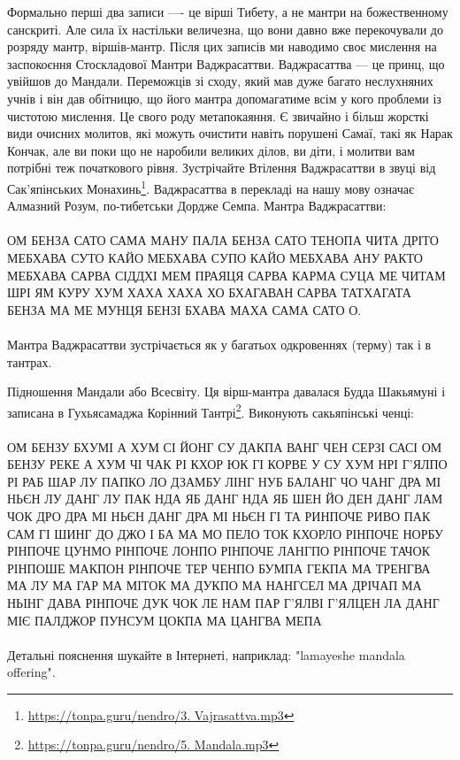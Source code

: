 Формально перші два записи ---- це вірші Тибету, а не мантри
на божественному санскриті. Але сила їх настільки величезна, що
вони давно вже перекочували до розряду мантр, віршів-мантр. Після
цих записів ми наводимо своє мислення на заспокоєння Стоскладової
Мантри Ваджрасаттви. Ваджрасаттва --- це принц, що увійшов до Мандали.
Переможців зі сходу, який мав дуже багато неслухняних
учнів і він дав обітницю, що його мантра допомагатиме всім у кого
проблеми із чистотою мислення. Це свого роду метапокаяння.
Є звичайно і більш жорсткі види очисних молитов, які можуть
очистити навіть порушені Самаї, такі як Нарак Кончак, але ви поки що
не наробили великих ділов, ви діти, і молитви вам потрібні теж початкового
рівня. Зустрічайте Втілення Ваджрасаттви в звуці від
Сак'япінських Монахинь\footnote{\url{https://tonpa.guru/nendro/3. Vajrasattva.mp3}}.
Ваджрасаттва в перекладі на нашу мову означає Алмазний Розум, по-тибетськи
Дордже Семпа. Мантра Ваджрасаттви:
\\
\\
ОМ БЕНЗА САТО САМА МАНУ ПАЛА БЕНЗА САТО ТЕНОПА ЧИТА ДРІТО
МЕБХАВА СУТО КАЙО МЕБХАВА СУПО КАЙО МЕБХАВА АНУ РАКТО МЕБХАВА
САРВА СІДДХІ МЕМ ПРАЯЦЯ САРВА КАРМА СУЦА МЕ ЧИТАМ ШРІ ЯМ КУРУ
ХУМ ХАХА ХАХА ХО БХАГАВАН САРВА ТАТХАГАТА БЕНЗА МА МЕ МУНЦЯ
БЕНЗІ БХАВА МАХА САМА САТО О.
\\
\\
Мантра Ваджрасаттви зустрічається як у багатьох одкровеннях (терму) так і в тантрах.

Підношення Мандали або Всесвіту. Ця вірш-мантра давалася
Будда Шакьямуні і записана в Гухьясамаджа Корінний
Тантрі\footnote{\url{https://tonpa.guru/nendro/5. Mandala.mp3}}.
Виконують сакьяпінські ченці:
\\
\\
ОМ БЕНЗУ БХУМІ А ХУМ СІ ЙОНГ СУ ДАКПА ВАНГ ЧЕН СЕРЗІ
САСІ ОМ БЕНЗУ РЕКЕ А ХУМ ЧІ ЧАК РІ КХОР ЮК ГІ КОРВЕ
У СУ ХУМ НРІ Г'ЯЛПО РІ РАБ ШАР ЛУ ПАПКО ЛО ДЗАМБУ
ЛІНГ НУБ БАЛАНГ ЧО ЧАНГ ДРА МІ НЬЄН ЛУ ДАНГ ЛУ ПАК
НДА ЯБ ДАНГ НДА ЯБ ШЕН ЙО ДЕН ДАНГ ЛАМ ЧОК ДРО ДРА
МІ НЬЄН ДАНГ ДРА МІ НЬЄН ГІ ТА РИНПОЧЕ РИВО ПАК САМ
ГІ ШИНГ ДО ДЖО І БА МА МО ПЕЛО ТОК КХОРЛО РІНПОЧЕ
НОРБУ РІНПОЧЕ ЦУНМО РІНПОЧЕ ЛОНПО РІНПОЧЕ ЛАНГПО
РІНПОЧЕ ТАЧОК РІНПОШЕ МАКПОН РІНПОЧЕ ТЕР ЧЕНПО
БУМПА ГЕКПА МА ТРЕНГВА МА ЛУ МА ГАР МА МІТОК МА
ДУКПО МА НАНГСЕЛ МА ДРІЧАП МА НЬІНГ ДАВА РІНПОЧЕ
ДУК ЧОК ЛЕ НАМ ПАР Г'ЯЛВІ Г'ЯЛЦЕН ЛА ДАНГ МІЄ ПАЛДЖОР
ПУНСУМ ЦОКПА МА ЦАНГВА МЕПА
\\
\\
Детальні пояснення шукайте в Інтернеті, наприклад: "lamayeshe mandala offering".

